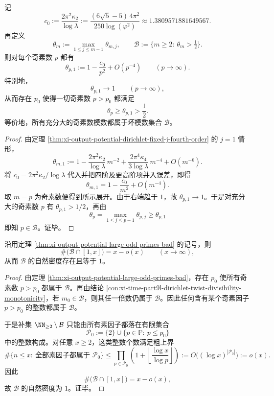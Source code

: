 \begin{theorem}[充分大奇素数模数的平方根门槛必然失效]\label{thm:xi-output-potential-large-odd-primes-bad}
记
\[
c_0:=\frac{2\pi^2\kappa_2}{\log\lambda}
:=\frac{(6\sqrt5-5)\,4\pi^2}{250\log(\varphi^2)}
\approx 1.3809571881649567.
\]
再定义
\[
\theta_m:=\max_{1\le j\le m-1}\theta_{m,j},
\qquad
\mathcal B:=\{m\ge 2:\ \theta_m>\tfrac12\}.
\]
则对每个奇素数 \(p\) 都有
\[
\theta_{p,1}
:=
1-\frac{c_0}{p^2}+O(p^{-4})
\qquad(p\to\infty).
\]
特别地，
\[
\theta_{p,1}\longrightarrow 1
\qquad(p\to\infty),
\]
从而存在 \(p_0\) 使得一切奇素数 \(p>p_0\) 都满足
\[
\theta_p\ge \theta_{p,1}>\frac12.
\]
等价地，所有充分大的奇素数模数都属于坏模数集合 \(\mathcal B\)。
\end{theorem}
\begin{proof}
由定理 \ref{thm:xi-output-potential-dirichlet-fixed-j-fourth-order} 的 \(j=1\) 情形，
\[
\theta_{m,1}
:=
1-\frac{2\pi^2\kappa_2}{\log\lambda}\,m^{-2}
+\frac{2\pi^4\kappa_4}{3\log\lambda}\,m^{-4}
+O(m^{-6}).
\]
将
\(
c_0=2\pi^2\kappa_2/\log\lambda
\)
代入并把四阶及更高阶项并入误差，即得
\[
\theta_{m,1}=1-\frac{c_0}{m^2}+O(m^{-4}).
\]
取 \(m=p\) 为奇素数便得到所示展开。由于右端趋于 \(1\)，故 \(\theta_{p,1}\to 1\)。于是对充分大的奇素数 \(p\) 有 \(\theta_{p,1}>1/2\)，再由
\[
\theta_p=\max_{1\le j\le p-1}\theta_{p,j}\ge \theta_{p,1}
\]
即知 \(p\in\mathcal B\)。证毕。
\end{proof}

\begin{corollary}\label{cor:xi-output-potential-bad-moduli-density-one}
沿用定理 \ref{thm:xi-output-potential-large-odd-primes-bad} 的记号，则
\[
\#\bigl(\mathcal B\cap [1,x]\bigr)=x-o(x)
\qquad(x\to\infty),
\]
从而 \(\mathcal B\) 的自然密度存在且等于 \(1\)。
\end{corollary}
\begin{proof}
由定理 \ref{thm:xi-output-potential-large-odd-primes-bad}，存在 \(p_0\) 使所有奇素数 \(p>p_0\) 都属于 \(\mathcal B\)。再由结论
\ref{con:xi-time-part9l-dirichlet-twist-divisibility-monotonicity}，若 \(m_0\in\mathcal B\)，则其任一倍数仍属于 \(\mathcal B\)。因此任何含有某个奇素因子 \(p>p_0\) 的整数都属于 \(\mathcal B\)。

于是补集 \(\NN_{\ge 2}\setminus\mathcal B\) 只能由所有素因子都落在有限集合
\[
\mathcal P_0:=\{2\}\cup\{p\in\mathbb P:\ p\le p_0\}
\]
中的整数构成。对任意 \(x\ge 2\)，这类整数个数满足粗上界
\[
\#\{n\le x:\ \text{全部素因子都属于 }\mathcal P_0\}
\le
\prod_{p\in\mathcal P_0}
\left(1+\left\lfloor\frac{\log x}{\log p}\right\rfloor\right)
:=
O\!\bigl((\log x)^{|\mathcal P_0|}\bigr)
:=
o(x).
\]
因此
\[
\#\bigl(\mathcal B\cap [1,x]\bigr)=x-o(x),
\]
故 \(\mathcal B\) 的自然密度为 \(1\)。证毕。
\end{proof}

